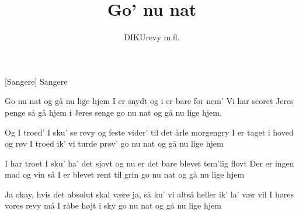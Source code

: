 \documentclass[a4paper,11pt]{article}
\title{Go' nu nat}
\author{DIKUrevy m.fl.}
\begin{document}
\maketitle

\begin{roles}
[Sangere] Sangere
\end{roles}


\begin{song}
%
Go nu nat og gå nu lige hjem
I er snydt og i er bare for nem'
Vi har scoret Jeres penge
så gå hjem i Jeres senge
go nu nat og gå nu lige hjem.

Og I troed' I sku' se revy
og feste vider' til det årle morgengry
I er taget i hoved og røv
I troed ik' vi turde prøv'
go nu nat og gå nu lige hjem

I har troet I sku' ha' det sjovt
og nu er det bare blevet tem'lig flovt
Der er ingen mad og vin
så I er blevet rent til grin
go nu nat og gå nu lige hjem
\end{song}
\begin{song}
Ja okay, hvis det absolut skal være
ja, så ku' vi altså heller ik' la' vær
vil I høres vores revy
må I råbe højt i sky 
go nu nat og gå nu lige hjem
\end{song}
\end{document}
